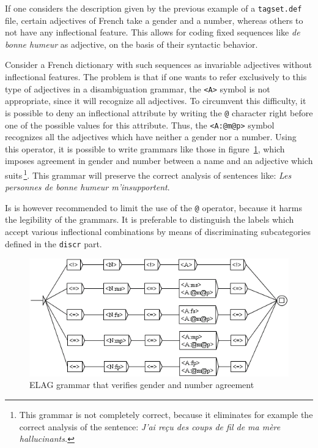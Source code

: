 \bigskip
\noindent If one considers the description given by the previous example of a
\verb$tagset.def$ file, certain adjectives of French take a gender and a number,
whereas others to not have any inflectional feature. This allows for coding fixed
sequences like \textit{de bonne humeur} as adjective, on the basis of their
syntactic behavior.

\bigskip
\noindent Consider a French dictionary with such sequences as invariable adjectives without
inflectional features. The problem is that if one wants to refer exclusively to
this type of adjectives in a disambiguation grammar, the \verb$<A>$ symbol is not
appropriate, since it will recognize all adjectives. To circumvent this
difficulty, it is possible to deny an inflectional attribute by writing the
\verb$@$ character right before one of the possible values for this attribute.
Thus, the \verb$<A:@m@p>$ symbol recognizes all the adjectives which have neither
a gender nor a number. Using this operator, it is possible to write grammars like
those in figure~\ref{fig-NA}, which imposes agreement in gender and number
between a name and an adjective which suits\,\footnote{This grammar is not
completely correct, because it eliminates for example the correct analysis of the
sentence: \textit{J'ai re\c{c}u des coups de fil de ma m\`ere hallucinants.}}.
This grammar will preserve the correct analysis of sentences like: \textit{Les
personnes de bonne humeur m'insupportent}.

\bigskip
\noindent Is is however recommended to limit the use of the \verb$@$ operator, because it
harms the legibility of the grammars. It is preferable to distinguish the labels
which accept various inflectional combinations by means of discriminating
subcategories defined in the \verb$discr$ part.

\begin{figure}[!ht]
\begin{center}
\includegraphics[width=12cm]{resources/img/fig7-19.png}
\caption{ELAG grammar that verifies gender and number agreement\label{fig-NA}}
\end{center}
\end{figure}


